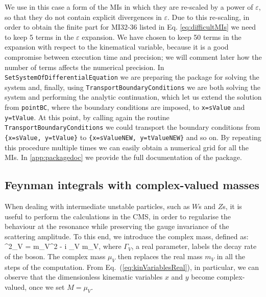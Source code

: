 We use in this case a form of the MIs in which they are re-scaled by a power of $\varepsilon$, so that they do not contain explicit divergences in $\varepsilon$. 
Due to this re-scaling, in order to obtain the finite part for MI32-36 listed in Eq. \ref{eq:difficultMIs} we need to keep 5 terms in the $\varepsilon$ expansion.
We have chosen to keep 50
terms in the expansion with respect to the kinematical variable, because it is a good compromise between execution time and precision; we will comment later 
how the number of terms affects the numerical precision. In \texttt{SetSystemOfDifferentialEquation} 
we are preparing the package for solving the system and, finally, using \texttt{Transport\-Boundary\-Conditions}
we are both solving the system and performing the analytic continuation, which let
us extend the solution from \texttt{pointBC}, where the boundary conditions are imposed, to \texttt{x=sValue} and 
\texttt{y=tValue}. At this point, by calling again the routine \texttt{Transport\-Boundary\-Conditions} we could transport the boundary conditions from \texttt{\{x=sValue, y=tValue\}} to 
\texttt{\{x=sValueNEW, y=tValueNEW\}} and so on. By repeating this procedure multiple times we can easily obtain a numerical grid for all the MIs. In \ref{app:packagedoc} we provide the full documentation of the package.

\subsection{Feynman integrals with complex-valued masses}

When dealing with intermediate unstable particles, such as $W$s and $Z$s, it is useful to perform the calculations in the CMS, in order to regularise the behaviour at the resonance while preserving the gauge invariance of the scattering amplitude.
To this end, we introduce the complex mass, defined as:
\be 
\label{eq:complex_mass}
\mu^2_V = m_V^2 - i \Gamma_V m_V,
\ee
where $\Gamma_V$, a real parameter, labels the decay rate of the boson.
The complex mass $\mu_V$ then replaces the real mass $m_V$ in all the steps of the computation.
From Eq.~(\ref{eq:kinVariablesReal}), in particular, we can observe that the
dimensionless kinematic variables $x$ and $y$ become complex-valued, once we set $M=\mu_V$.

